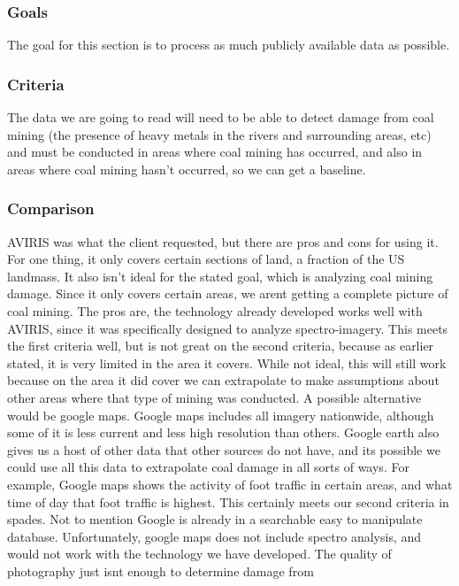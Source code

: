 \documentclass[10pt,draftclsnofoot,onecolumn,journal,compsoc]{IEEEtran}
\begin{document}
\subsubsection{Goals}
\noindent The goal for this section is to process as much publicly available data as possible.

\subsubsection{Criteria}
\noindent The data we are going to
read will need to be able to detect damage from coal mining (the presence of heavy metals in the rivers and
surrounding areas, etc) and must be conducted in areas where coal mining has occurred, and also in areas where
coal mining hasn’t occurred, so we can get a baseline.

\subsubsection{Comparison}
AVIRIS was what the client requested, but there are pros and cons for using it. For one thing, it only covers
certain sections of land, a fraction of the US landmass. It also isn't ideal for the stated goal, which is analyzing
coal mining damage. Since it only covers certain areas, we arent getting a complete picture of coal mining. The
pros are, the technology already developed works well with AVIRIS, since it was specifically designed to analyze
spectro-imagery. This meets the first criteria well, but is not great on the second criteria, because as earlier stated,
it is very limited in the area it covers. While not ideal, this will still work because on the area it did cover we
can extrapolate to make assumptions about other areas where that type of mining was conducted.\cite{3}
A possible alternative would be google maps. Google maps includes all imagery nationwide, although some
of it is less current and less high resolution than others. Google earth also gives us a host of other data that other
sources do not have, and its possible we could use all this data to extrapolate coal damage in all sorts of ways.
For example, Google maps shows the activity of foot traffic in certain areas, and what time of day that foot traffic
is highest. This certainly meets our second criteria in spades. Not to mention Google is already in a searchable
easy to manipulate database. Unfortunately, google maps does not include spectro analysis, and would not work
with the technology we have developed. The quality of photography just isnt enough to determine damage from
\end{document}
